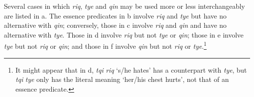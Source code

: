 \documentclass[output=paper]{langsci/langscibook}
\begin{document}
Several cases in which \emph{riq}, \emph{tye} and \emph{qin} may be used more or less interchangeably are listed in
a. The essence predicates in b involve \emph{riq} and \emph{tye} but have no alternative with
\emph{qin}; conversely, those in c involve \emph{riq} and \emph{qin} and have no alternative with \emph{tye}. Those
in d involve \emph{riq} but not \emph{tye} or \emph{qin}; those in e involve \emph{tye} but not \emph{riq} or
\emph{qin}; and those in f involve \emph{qin} but not \emph{riq} or \emph{tye}.\footnote{It might appear that in d, \emph{tqi} \emph{riq} `s/he hates' has a counterpart with \emph{tye}, but \emph{tqi} \emph{tye} only has the literal meaning `her/his chest hurts', not that of an essence predicate.}
\end{document}

